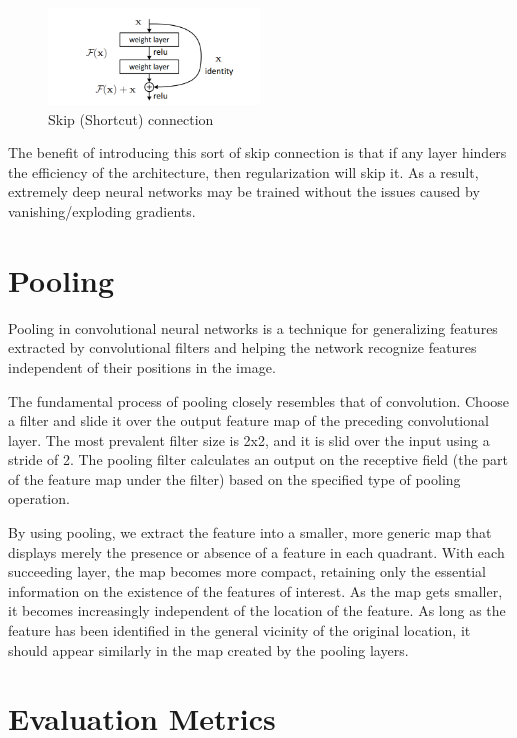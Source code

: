 \begin{figure}[htbp!]
\centering
\includegraphics[width=0.5\textwidth]{images/background/Residual-Block.PNG}
\caption{Skip (Shortcut) connection}
\label{fig:res_block}
\end{figure}

The benefit of introducing this sort of skip connection is that if any layer hinders the efficiency of the architecture, then regularization will skip it.
As a result, extremely deep neural networks may be trained without the issues caused by vanishing/exploding gradients. 

\section{Pooling}

Pooling in convolutional neural networks is a technique for generalizing features extracted by convolutional filters and helping the network recognize features independent of their positions in the image. 

The fundamental process of pooling closely resembles that of convolution. Choose a filter and slide it over the output feature map of the preceding convolutional layer. The most prevalent filter size is 2x2, and it is slid over the input using a stride of 2. The pooling filter calculates an output on the receptive field (the part of the feature map under the filter) based on the specified type of pooling operation. 

By using pooling, we extract the feature into a smaller, more generic map that displays merely the presence or absence of a feature in each quadrant. With each succeeding layer, the map becomes more compact, retaining only the essential information on the existence of the features of interest. As the map gets smaller, it becomes increasingly independent of the location of the feature. As long as the feature has been identified in the general vicinity of the original location, it should appear similarly in the map created by the pooling layers. 

\section{Evaluation Metrics}

